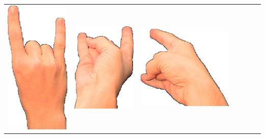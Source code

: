 \documentclass{article}
\begin{document}
\begin{center}
\begin{tabular}{r*{6}{c}}
\includegraphics[scale=0.1]{images/06-11-3.jpg}&
\includegraphics[scale=0.1]{images/06-11-4.jpg}&
\includegraphics[scale=0.1]{images/06-11-5.jpg}&

\end{tabular}
\end{center}
\end{document}
